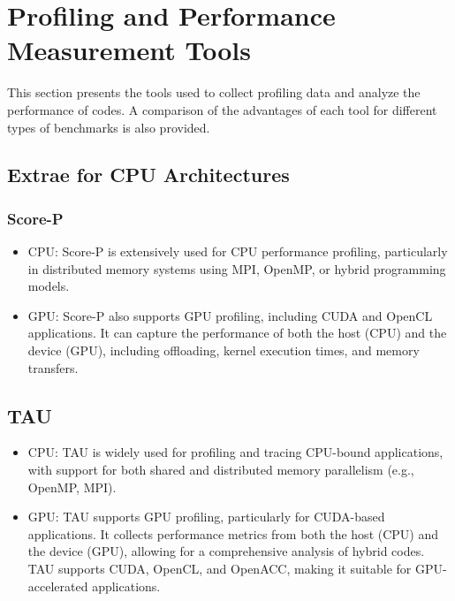 \section{Profiling and Performance Measurement Tools}
\label{sec:methodology-tools}

This section presents the tools used to collect profiling data and analyze the performance of codes. 
A comparison of the advantages of each tool for different types of benchmarks is also provided.

\subsection{Extrae for CPU Architectures}
\label{sec:methodology-tools-extrae}

\subsubsection{Score-P}
\label{sec:methodology-tools-scorep}

\begin{itemize}
    \item CPU: Score-P is extensively used for CPU performance profiling, particularly in distributed memory systems using MPI, OpenMP, or hybrid programming models.
    \item GPU: Score-P also supports GPU profiling, including CUDA and OpenCL applications. It can capture the performance of both the host (CPU) and the device (GPU), including offloading, kernel execution times, and memory transfers.
\end{itemize}


\subsection{TAU}
\label{sec:methodology-tools-tau}

\begin{itemize}
    \item  CPU: TAU is widely used for profiling and tracing CPU-bound applications, with support for both shared and distributed memory parallelism (e.g., OpenMP, MPI).
    \item GPU: TAU supports GPU profiling, particularly for CUDA-based applications. It collects performance metrics from both the host (CPU) and the device (GPU), allowing for a comprehensive analysis of hybrid codes. TAU supports CUDA, OpenCL, and OpenACC, making it suitable for GPU-accelerated applications.
\end{itemize}



